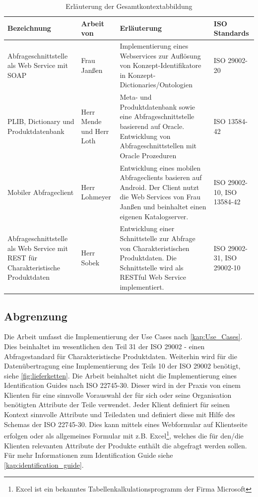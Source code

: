 \begin{table}[!hbt]\vspace{1ex}\centering
\scriptsize
\begin{tabular}{p{3cm}p{2.2cm}p{5cm}p{2.6cm}}
\toprule \rowcolor{mylightergray}
\textbf{Bezeichnung} & \textbf{Arbeit von} & \textbf{Erläuterung} &  \textbf{ISO Standards}\\
\midrule
Abfrageschnittstelle als Web Service mit SOAP &  Frau Janßen & Implementierung eines Webservices zur Auflösung von Konzept-Identifikatore in Konzept-Dictionaries/Ontologien & ISO 29002-20 \\
\hline
PLIB, Dictionary und Produktdatenbank &  Herr Mende und Herr Loth & Meta- und Produktdatenbank  sowie eine Abfrageschnittstelle basierend auf Oracle. Entwicklung von Abfrageschnittstellen mit Oracle Prozeduren & ISO 13584-42 \citep[Vergl.][]{iso13584-42}  \\
\hline
Mobiler Abfrageclient & Herr Lohmeyer & Entwicklung eines mobilen Abfrageclients basieren auf Android. Der Client nutzt die Web Services von Frau Janßen und beinhaltet einen eigenen Katalogserver. & ISO 29002-10, ISO 13584-42 \\
\hline
Abfrageschnittstelle als Web Service mit REST für Charakteristische Produktdaten & Herr Sobek & Entwicklung einer Schnittstelle zur Abfrage von Charakteristischen Produktdaten. Die Schnittstelle wird als RESTful Web Service implementiert. & ISO 29002-31, ISO 29002-10 \\
\bottomrule
\end{tabular}
\caption{\label{tab.gesamtkontext}Erläuterung der Gesamtkontextabbildung}
\vspace{2ex}\end{table}

\subsection{Abgrenzung}

Die Arbeit umfasst die Implementierung der Use Cases nach \autoref{kap:Use_Cases}. Dies beinhaltet im wesentlichen den Teil 31 der ISO 29002 - einen Abfragestandard für Charakteristische Produktdaten. 
Weiterhin wird für die Datenübertragung eine Implementierung des Teils 10 der ISO 29002 benötigt, siehe \autoref{fig:lieferketten}. 
Die Arbeit beinhaltet nicht die Implementierung eines Identification Guides nach ISO 22745-30. Dieser wird in der Praxis von einem Klienten für eine sinnvolle Vorauswahl der für sich oder seine Organisation benötigten Attribute der Teile verwendet. Jeder Klient definiert für seinen Kontext sinnvolle Attribute und Teiledaten und definiert diese mit Hilfe des Schemas der ISO 22745-30. Dies kann mittels eines Webformular auf Klientseite erfolgen oder als allgemeines Formular mit z.B. Excel\footnote{Excel ist ein bekanntes Tabellenkalkulationsprogramm der Firma Microsoft}, welches die für den/die Klienten relevanten Attribute der Produkte enthält die abgefragt werden sollen. Für mehr Informationen zum Identification Guide siehe \autoref{kap:identification_guide}.

